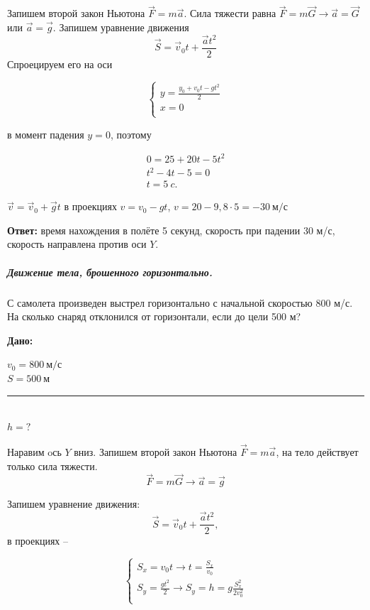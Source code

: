 \documentclass[a5paper, 10pt]{diss_4}
\newcommand{\TNF}{$\vec{F}=m\vec{a}$}
\renewcommand{\'}{\,'}
\newcommand{\UDV}{\vec{S}=\vec{v}_0t+\frac{\vec{a}t^2}{2}}
\begin{document}
Запишем второй закон Ньютона \TNF.
Сила тяжести равна $\vec{F}=m\vec{G}\to\vec{a}=\vec{G}$ или $\vec{a}=\vec{g}$.  Запишем уравнение движения
\[
\UDV
\]
 Спроецируем его на оси

\begin{equation*}
     \left\{
          \begin{array}{lr}
 y=\frac{y_0+v_0t-gt^2}{2}\\
 x=0\\
          \end{array}
     \right.
\end{equation*}

в момент падения $y=0$, поэтому

\begin{gather*}
0=25+20t-5t^2\\
t^2-4t-5=0\\
t=5\ c.
\end{gather*}

$\vec{v}=\vec{v}_0+\vec{g}t$ в проекциях $v=v_0-gt$, $v=20-9,8\cdot5=-30\ м/с$

\textbf{Ответ:} время нахождения в полёте 5 секунд, скорость при падении 30 м/с, скорость направлена против оси $Y$.

\subparagraph*{Движение тела, брошенного горизонтально.}

С самолета произведен выстрел горизонтально с начальной скоростью 800 м/с. На сколько снаряд отклонился от горизонтали, если до цели 500 м?

\hspace{1cm}\textbf{Дано:}\hspace{.3cm}
\parbox[t]{4cm}{
$v_0 = 800\ м/с$\\
$S=500\ м$\\
\rule{4cm}{.4pt}\\
$h = ?$\\
}

Наравим oсь $Y$ вниз. Запишем второй закон Ньютона \TNF, на тело действует только сила тяжести.
\[
\vec{F}=m\vec{G}\to\vec{a}=\vec{g}
\]

Запишем уравнение движения:
\[
\UDV,
\]
в проекциях --

\begin{equation*}
     \left\{
          \begin{array}{lr}
 S_x=v_0t\to t=\frac{S_x}{v_0}\\
 S_y=\frac{gt^2}{2}\to S_y=h=g\frac{S_x^2}{2v_0^2}\\
          \end{array}
     \right.
\end{equation*}
\end{document}
